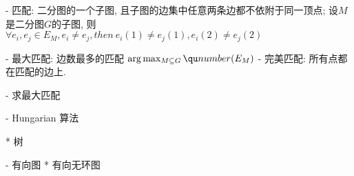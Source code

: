 				\Property
					- 匹配: 二分图的一个子图, 且子图的边集中任意两条边都不依附于同一顶点;
						设$M$是二分图$G$的子图, 则
						$\forall e_i, e_j \in E_M, e_i≠e_j, then\ e_i(1) ≠e_j(1), e_i(2) ≠e_j(2)$

						- 最大匹配: 边数最多的匹配 $\arg\max_{M \subseteq G} \qu number(E_M)$
						- 完美匹配: 所有点都在匹配的边上.

						- 求最大匹配
							\Problem
								
							\Algorithm
								- Hungarian 算法

			* 树

		- 有向图
			* 有向无环图

